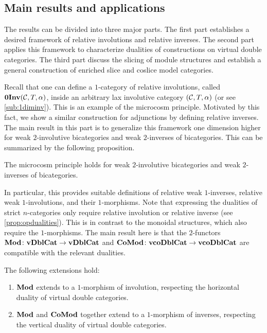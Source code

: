 \subsection{Main results and applications}

The results can be divided into three major parts. The first part establishes a desired framework of relative involutions and relative inverses. The second part applies this framework to characterize dualities of constructions on virtual double categories. The third part discuss the slicing of module structures and establish a general construction of enriched slice and coslice model categories.

Recall that one can define a $1$-category of relative involutions, called $\mathbf{0Inv}(\mathcal{C},T,\alpha)$, inside an arbitrary lax involutive category $(\mathcal{C},T,\alpha)$ \cite{yauinvcat2020} (or see \cref{sub:1diminv}). This is an example of the microcosm principle. Motivated by this fact, we show a similar construction for adjunctions by defining relative inverses. The main result in this part is to generalize this framework one dimension higher for weak $2$-involutive bicategories and weak $2$-inverses of bicategories. This can be summarized by the following proposition.

\begin{proposition*}
	The microcosm principle holds for weak $2$-involutive bicategories and weak $2$-inverses of bicategories.
\end{proposition*}

In particular, this provides suitable definitions of relative weak $1$-inverses, relative weak $1$-involutions, and their $1$-morphisms. Note that expressing the dualities of strict $n$-categories only require relative involution or relative inverse (see \cref{prop:opdualities}). This is in contrast to the monoidal structures, which also require the $1$-morphisms. The main result here is that the $2$-functors $\mathbf{Mod} \colon \mathbf{vDblCat} \rightarrow \mathbf{vDblCat}$ and $\mathbf{CoMod} \colon \mathbf{vcoDblCat} \rightarrow \mathbf{vcoDblCat}$ are compatible with the relevant dualities.

\begin{theorem*} The following extensions hold:
	\begin{enumerate}
		\item $\mathbf{Mod}$ extends to a $1$-morphism of involution, respecting the horizontal duality of virtual double categories. 
		
		\item $\mathbf{Mod}$ and $\mathbf{CoMod}$ together extend to a $1$-morphism of inverses, respecting the vertical duality of virtual double categories.
	\end{enumerate}
\end{theorem*}

